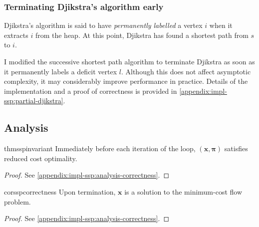 \subsubsection{Terminating Djikstra's algorithm early}

Djikstra's algorithm is said to have \emph{permanently labelled} a vertex $i$ when it extracts $i$ from the heap. At this point, Djikstra has found a shortest path from $s$ to $i$.

I modified the successive shortest path algorithm to terminate Djikstra as soon as it permanently labels a deficit vertex $l$. Although this does not affect asymptotic complexity, it may considerably improve performance in practice. Details of the implementation and a proof of correctness is provided in \cref{appendix:impl-ssp:partial-djikstra}.\\

\subsection{Analysis} \label{sec:impl-ssp-analysis}

\begin{restatable}{thm}{sspinvariant} \label{thm:ssp-invariant}
    Immediately before each iteration of the loop, $(\mathbf{x},\boldsymbol{\pi})$ satisfies reduced cost optimality.
\end{restatable}
\begin{proof}
See \cref{appendix:impl-ssp:analysis-correctness}.
\end{proof}
\begin{restatable}{cor}{sspcorrectness} \label{cor:ssp-correctness}
    Upon termination, $\mathbf{x}$ is a solution to the minimum-cost flow problem.
\end{restatable}
\begin{proof}
See \cref{appendix:impl-ssp:analysis-correctness}.
\end{proof}

